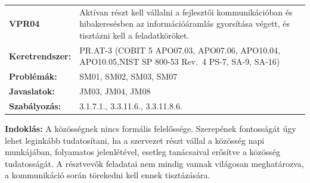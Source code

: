 \documentclass[12pt,magyar,a4paper,oneside]{scrreprt}
\begin{document}
\begin{longtable}[]{@{}ll@{}}
\toprule
\endhead
\begin{minipage}[t]{0.16\columnwidth}\raggedright
\textbf{VPR04}\strut
\end{minipage} & \begin{minipage}[t]{0.79\columnwidth}\raggedright
Aktívan részt kell vállalni a fejlesztői kommunikációban és
hibakeresésben az információáramlás gyorsítása végett, és tisztázni kell
a feladatköröket.\strut
\end{minipage}\tabularnewline
\begin{minipage}[t]{0.16\columnwidth}\raggedright
\textbf{Keretrendszer:}\strut
\end{minipage} & \begin{minipage}[t]{0.79\columnwidth}\raggedright
PR.AT-3 (COBIT 5 APO07.03, APO07.06, APO10.04, APO10.05,NIST SP 800-53
Rev.~4 PS-7, SA-9, SA-16)\strut
\end{minipage}\tabularnewline
\begin{minipage}[t]{0.16\columnwidth}\raggedright
\textbf{Problémák:}\strut
\end{minipage} & \begin{minipage}[t]{0.79\columnwidth}\raggedright
SM01, SM02, SM03, SM07\strut
\end{minipage}\tabularnewline
\begin{minipage}[t]{0.16\columnwidth}\raggedright
\textbf{Javaslatok:}\strut
\end{minipage} & \begin{minipage}[t]{0.79\columnwidth}\raggedright
JM03, JM04, JM08\strut
\end{minipage}\tabularnewline
\begin{minipage}[t]{0.16\columnwidth}\raggedright
\textbf{Szabályozás:}\strut
\end{minipage} & \begin{minipage}[t]{0.79\columnwidth}\raggedright
3.1.7.1., 3.3.11.6., 3.3.11.8.6.\strut
\end{minipage}\tabularnewline
\bottomrule
\end{longtable}

\textbf{Indoklás: } A közösségnek nincs formális felelőssége. Szerepének
fontosságát úgy lehet leginkább tudatosítani, ha a szervezet részt
vállal a közösség napi munkájában, folyamatos jelenlétével, esetleg
tanácsaival erősítve a közösség tudatosságát. A résztvevők feladatai nem
mindig vannak világosan meghatározva, a kommunikáció során törekedni
kell ennek tisztázására.
\end{document}

